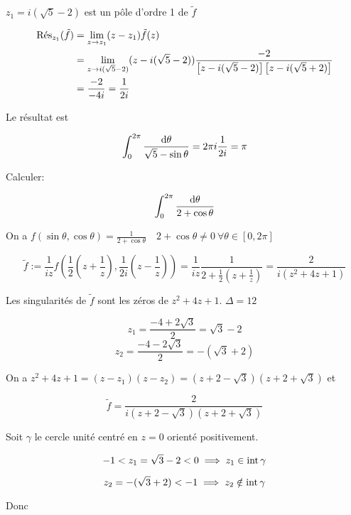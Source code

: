 \begin{enumerate}[label=\alph*)]
\begin{example}[1]
        $z_1 = i(\sqrt{5} - 2)$ est un pôle d'ordre 1 de $\tilde{f}$
        
        \begin{align*}
        \Res_{z_1} (\tilde{f})& = \lim_{z \rightarrow z_1} (z - z_1) \tilde{f}(z) \\&= \lim_{z \rightarrow i(\sqrt{5} - 2)} (z - i(\sqrt{5} - 2)) \frac{-2}{\left[ z - i(\sqrt{5} - 2) \right] \left[ z - i(\sqrt{5} + 2) \right]}
        \\&= \frac{-2}{-4i} = \frac{1}{2i}
        \end{align*}
        
        Le résultat est
        
        \[ \int_0^{2\pi} \frac{\dth}{\sqrt{5} - \sin \theta} = 2 \pi i \frac{1}{2i} = \pi \]
    \end{example}

    \begin{example}[2]
        Calculer:
        
        \[ \int_0^{2\pi} \frac{\dth}{2 + \cos \theta} \]
        
        On a $f(\sin \theta, \cos \theta) = \frac{1}{2 + \cos \theta} \quad 2 + \cos \theta \neq 0 \ \forall \theta \in [0, 2\pi]$
        
        \[ \tilde{f} := \frac{1}{iz} f\left(\frac{1}{2} \left(z + \frac{1}{z}\right), \frac{1}{2i} \left(z - \frac{1}{z}\right)\right) = \frac{1}{iz} \frac{1}{2 + \frac{1}{2} \left(z + \frac{1}{z}\right)} = \frac{2}{i \left(z^2 + 4z + 1\right)} \]
        
        Les singularités de $\tilde{f}$ sont les zéros de $z^2 + 4z + 1$. $\Delta = 12$
        
        \[ z_1 = \frac{-4 + 2\sqrt{3}}{2} = \sqrt{3} - 2 \]
        \[ z_2 = \frac{-4 - 2\sqrt{3}}{2} = -(\sqrt{3} + 2) \]
        
        On a $z^2 +  4z + 1 = (z - z_1)(z - z_2) = (z + 2 - \sqrt{3})(z + 2 + \sqrt{3})$ et
        
        \[ \tilde{f} = \frac{2}{i(z + 2 - \sqrt{3})(z + 2 + \sqrt{3})} \]
        
        Soit $\gamma$ le cercle unité centré en $z = 0$ orienté positivement.
        
        \[ -1 < z_1 = \sqrt{3} - 2 < 0 \implies  z_1 \in \inte \gamma \]
        
        \[ z_2 = -(\sqrt{3} + 2) < -1 \implies  z_2 \notin \inte \gamma \]
        
        Donc
        

\end{example}
\end{enumerate}
